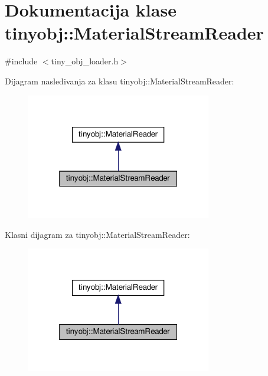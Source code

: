 \hypertarget{classtinyobj_1_1MaterialStreamReader}{}\section{Dokumentacija klase tinyobj\+:\+:Material\+Stream\+Reader}
\label{classtinyobj_1_1MaterialStreamReader}


{\ttfamily \#include $<$tiny\+\_\+obj\+\_\+loader.\+h$>$}



Dijagram nasleđivanja za klasu tinyobj\+:\+:Material\+Stream\+Reader\+:\nopagebreak
\begin{figure}[H]
\begin{center}
\leavevmode
\includegraphics[width=229pt]{classtinyobj_1_1MaterialStreamReader__inherit__graph}
\end{center}
\end{figure}


Klasni dijagram za tinyobj\+:\+:Material\+Stream\+Reader\+:\nopagebreak
\begin{figure}[H]
\begin{center}
\leavevmode
\includegraphics[width=229pt]{classtinyobj_1_1MaterialStreamReader__coll__graph}
\end{center}
\end{figure}
